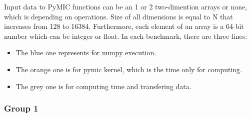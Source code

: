 Input data to PyMIC functions can be an 1 or 2 two-dimention arrays or none, which is depending on operations. Size of all dimensions is equal to N that increases from 128 to 16384. Furthermore, each element of an array is a 64-bit number which can be integer or float. In each benchmark, there are three lines:
\begin{itemize}
	\item The blue one represents for numpy execution.
	\item The orange one is for pymic kernel, which is the time only for computing.
	\item The grey one is for computing time and transfering data.
\end{itemize}

\subsubsection{Group 1}


